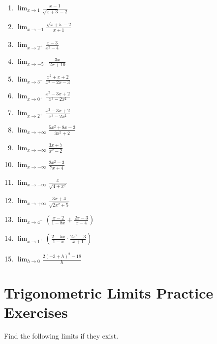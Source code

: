 \documentclass{book}
\begin{document}
\begin{enumerate}
    \item $\displaystyle \lim_{x \to 1} \frac{x - 1}{\sqrt{x + 3} - 2}$
    \item $\displaystyle \lim_{x \to -1} \frac{\sqrt{x + 5} - 2}{x + 1}$
    \item $\displaystyle \lim_{x \to 2^+} \frac{x - 3}{x^2 - 4}$
    \item $\displaystyle \lim_{x \to -5^-} \frac{3x}{2x+10}$
    \item $\displaystyle \lim_{x \to 3^-} \frac{x^2 + x + 2}{x^2 - 2x - 3}$
    \item $\displaystyle \lim_{x \to 0^+} \frac{x^2 - 3x + 2}{x^3 - 2x^2}$
    \item $\displaystyle \lim_{x \to 2^+} \frac{x^2 - 3x + 2}{x^3 - 2x^2}$
    \item $\displaystyle \lim_{x \to +\infty} \frac{5x^2 + 8x - 3}{3x^2 + 2}$
    \item $\displaystyle \lim_{x \to -\infty} \frac{3x + 7}{x^2 - 2}$
    \item $\displaystyle \lim_{x \to -\infty} \frac{2x^2 - 3}{7x + 4}$
    \item $\displaystyle \lim_{x \to -\infty} \frac{x}{\sqrt{4 + x^2}}$
    \item $\displaystyle \lim_{x \to +\infty} \frac{3x + 4}{\sqrt{2x^2 + 5}}$
    \item $\displaystyle \lim_{x \to 4^-} \left( \frac{x - 2}{1 - 8x} + \frac{2x - 3}{x - 4} \right)$
    \item $\displaystyle \lim_{x \to 1^+} \left( \frac{2 - 5x}{1 - x} \cdot \frac{2x^2 - 3}{x + 1} \right)$
    \item $\displaystyle \lim_{h \to 0} \frac{2(-3 + h)^2 - 18}{h}$
\end{enumerate}

\vspace{1.5cm}

\section{Trigonometric Limits Practice Exercises}
Find the following limits if they exist.
\vspace{0.2cm}
\end{document}
